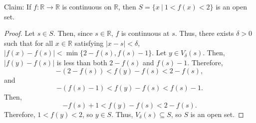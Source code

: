 \documentclass[12pt]{article}
\begin{document}
\newpage
{} Claim: If $f: \mathbb R \to \mathbb R$ is continuous on $\mathbb R$, then $S = \{x~|~1<f(x)<2\}$ is an open set.
\begin{proof}
    Let $s \in S$.
    Then, since $s \in \mathbb R$, $f$ is continuous at $s$.
    Thus, there exists $\delta > 0$ such that for all $x \in \mathbb R$ satisfying $|x - s| < \delta$, $|f(x) - f(s)| < \min\{2 - f(s), f(s) - 1\}$.
    Let $y \in V_\delta(s)$.
    Then, $|f(y) - f(s)|$ is less than both $2 - f(s)$ and $f(s) - 1$.
    Therefore, \[-(2 - f(s)) < f(y) - f(s) < 2 - f(s),\] and \[-(f(s) - 1) < f(y) - f(s) < f(s) - 1.\]
    Then, \[-f(s) + 1 < f(y) - f(s) < 2 - f(s).\]
    Therefore, $1 < f(y) < 2$, so $y \in S$.
    Thus, $V_\delta(s) \subseteq S$, so $S$ is an open set.
\end{proof}
\end{document}

